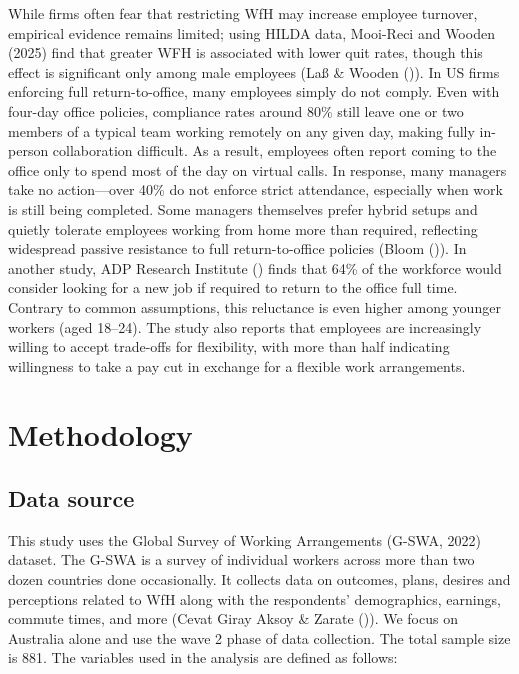 \documentclass[
  a4paper,
]{article}
\numberwithin{equation}{section}
\numberwithin{figure}{section}
\numberwithin{table}{section}
\begin{document}
While firms often fear that restricting WfH may increase employee turnover, empirical evidence remains limited; using HILDA data, Mooi-Reci and Wooden (2025) find that greater WFH is associated with lower quit rates, though this effect is significant only among male employees (Laß \& Wooden ()). In US firms enforcing full return-to-office, many employees simply do not comply. Even with four-day office policies, compliance rates around 80\% still leave one or two members of a typical team working remotely on any given day, making fully in-person collaboration difficult. As a result, employees often report coming to the office only to spend most of the day on virtual calls. In response, many managers take no action---over 40\% do not enforce strict attendance, especially when work is still being completed. Some managers themselves prefer hybrid setups and quietly tolerate employees working from home more than required, reflecting widespread passive resistance to full return-to-office policies (Bloom ()). In another study, ADP Research Institute () finds that 64\% of the workforce would consider looking for a new job if required to return to the office full time. Contrary to common assumptions, this reluctance is even higher among younger workers (aged 18--24). The study also reports that employees are increasingly willing to accept trade-offs for flexibility, with more than half indicating willingness to take a pay cut in exchange for a flexible work arrangements.

\section{Methodology}\label{methodology}

\subsection{Data source}\label{data-source}

This study uses the Global Survey of Working Arrangements (G-SWA, 2022) dataset. The G-SWA is a survey of individual workers across more than two dozen countries done occasionally. It collects data on outcomes, plans, desires and perceptions related to WfH along with the respondents' demographics, earnings, commute times, and more (Cevat Giray Aksoy \& Zarate ()). We focus on Australia alone and use the wave 2 phase of data collection. The total sample size is 881. The variables used in the analysis are defined as follows:
\end{document}
